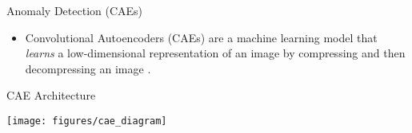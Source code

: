 \documentclass[10pt,handout]{beamer}
\begin{document}
%
%
%
%
%
%
%

\begin{frame}{Anomaly Detection (CAEs)}

\begin{itemize}
\item Convolutional Autoencoders (CAEs) are a machine learning model that \textit{learns} a low-dimensional representation of an image by compressing and then decompressing an image \cite{wta_detection, attention_anomalies}.\\[0.5cm]
\end{itemize}

\begin{exampleblock}{CAE Architecture}
\begin{center}
\texttt{[image: figures/cae\_diagram]}
\end{center}
\end{exampleblock}

\end{frame}
\end{document}
